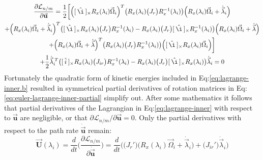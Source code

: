 \begin{multline}\label{eq:euler-lagrange-inner-partial}
\frac{\partial\mathcal{L}_{n/m}}{\partial\vec{\mathbf{u}}}=\frac{1}{2}\bigg[\Big([\hspace{2pt}\hat{\i}\hspace{2pt}]_\times R_x(\lambda_i)\vec{\Omega}_i\Big)^T\big(R_x(\lambda_i)\big(J_{r}\big)R_x^{-1}(\lambda_i)\big)\Big(R_x(\lambda_i)\vec{\Omega}_i+\dot{\vec{\lambda}}_i\Big)
\\
+\Big(R_x(\lambda_i)\vec{\Omega}_i+\dot{\vec{\lambda}}_i\Big)^T\big([\hspace{2pt}\hat{\i}\hspace{2pt}]_\times R_x(\lambda_i)\big(J_r\big)R_x^{-1}(\lambda_i)-R_x(\lambda_i)\big(J_r\big)[\hspace{2pt}\hat{\i}\hspace{2pt}]_\times R_x^{-1}(\lambda_i)\big)\Big(R_x(\lambda_i)\vec{\Omega}_i+\dot{\vec{\lambda}}\Big)
\\
+\Big(R_x(\lambda_i)\vec{\Omega}_i+\dot{\vec{\lambda}}\Big)^T\big(R_x(\lambda_i)\big(J_r\big)R_x^{-1}(\lambda_i)\big)\Big([\hspace{2pt}\hat{\i}\hspace{2pt}]_\times R_x(\lambda_i)\vec{\Omega}_i\Big)\bigg]
\\
+\frac{1}{2}\dot{\vec{\lambda}}_i^{\hspace{2pt}T}\big([\hspace{2pt}\hat{i}\hspace{2pt}]_\times R_x(\lambda_i)\big(J_{ir}\big)R_x^{-1}(\lambda_i)-R_x(\lambda_i)\big(J_r\big)[\hspace{2pt}\hat{\i}\hspace{2pt}]_\times R_x(\lambda_i)\big)\dot{\vec{\lambda}}_i=0
\end{multline}
Fortunately the quadratic form of kinetic energies included in Eq:\ref{eq:lagrange-inner.b} resulted in symmetrical partial derivatives of rotation matrices in Eq:\ref{eq:euler-lagrange-inner-partial} simplify out. After some mathematics it follows that partial derivatives of the Lagrangian in Eq:\ref{eq:lagrange-inner} with respect to $\vec{\mathbf{u}}$ are negligible, or that $\partial\mathcal{L}_{n/m}/\partial\vec{\mathbf{u}}= 0$. Only the partial derivatives with respect to the path rate $\dot{\vec{\mathbf{u}}}$ remain:
\begin{equation}\label{eq:3.42b}
\vec{\mathbf{U}}(\lambda_i)=\frac{d}{dt}\bigg(\frac{\partial \mathcal{L}_{n/m}}{\partial \dot{\vec{\mathbf{u}}}}\bigg)=\frac{d}{dt}\bigg(\big(J_{r}'\big)\Big(R_x(\lambda_i)\vec{\Omega}_i+\dot{\vec{\lambda}}_i\Big)+\big(J_{ir}'\big)\dot{\vec{\lambda}}_i\bigg)
\end{equation}
